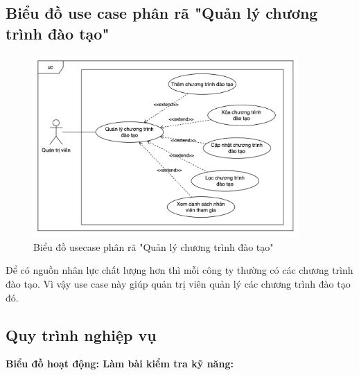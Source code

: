 \documentclass[../DoAn.tex]{subfiles}
\begin{document}
\subsection{Biểu đồ use case phân rã "Quản lý chương trình đào tạo"}
\label{subsection:2.2.13}
\begin{figure}[H]
    \centering
    \includegraphics[width=0.9\textwidth]{Hinhve/UC_QuanLyChuongTrinhDaoTao.png}
    \caption{Biểu đồ usecase phân rã "Quản lý chương trình đào tạo"}
\end{figure}
Để có nguồn nhân lực chất lượng hơn thì mỗi công ty thường có các chương trình đào tạo. Vì vậy use case này giúp quản trị viên quản lý các chương trình đào tạo đó.

\subsection{Quy trình nghiệp vụ}
\label{subsection:2.2.14}
\textbf{Biểu đồ hoạt động: Làm bài kiểm tra kỹ năng:}
\end{document}

